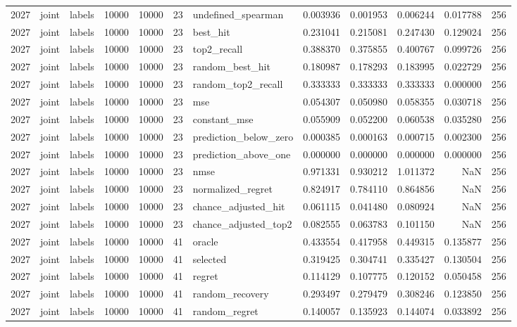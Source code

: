 \begin{tabular}{rllrrrlrrrrr}
2027 & joint & labels & 10000 & 10000 & 23 & undefined_spearman & 0.003936 & 0.001953 & 0.006244 & 0.017788 & 256 \\
2027 & joint & labels & 10000 & 10000 & 23 & best_hit & 0.231041 & 0.215081 & 0.247430 & 0.129024 & 256 \\
2027 & joint & labels & 10000 & 10000 & 23 & top2_recall & 0.388370 & 0.375855 & 0.400767 & 0.099726 & 256 \\
2027 & joint & labels & 10000 & 10000 & 23 & random_best_hit & 0.180987 & 0.178293 & 0.183995 & 0.022729 & 256 \\
2027 & joint & labels & 10000 & 10000 & 23 & random_top2_recall & 0.333333 & 0.333333 & 0.333333 & 0.000000 & 256 \\
2027 & joint & labels & 10000 & 10000 & 23 & mse & 0.054307 & 0.050980 & 0.058355 & 0.030718 & 256 \\
2027 & joint & labels & 10000 & 10000 & 23 & constant_mse & 0.055909 & 0.052200 & 0.060538 & 0.035280 & 256 \\
2027 & joint & labels & 10000 & 10000 & 23 & prediction_below_zero & 0.000385 & 0.000163 & 0.000715 & 0.002300 & 256 \\
2027 & joint & labels & 10000 & 10000 & 23 & prediction_above_one & 0.000000 & 0.000000 & 0.000000 & 0.000000 & 256 \\
2027 & joint & labels & 10000 & 10000 & 23 & nmse & 0.971331 & 0.930212 & 1.011372 & NaN & 256 \\
2027 & joint & labels & 10000 & 10000 & 23 & normalized_regret & 0.824917 & 0.784110 & 0.864856 & NaN & 256 \\
2027 & joint & labels & 10000 & 10000 & 23 & chance_adjusted_hit & 0.061115 & 0.041480 & 0.080924 & NaN & 256 \\
2027 & joint & labels & 10000 & 10000 & 23 & chance_adjusted_top2 & 0.082555 & 0.063783 & 0.101150 & NaN & 256 \\
2027 & joint & labels & 10000 & 10000 & 41 & oracle & 0.433554 & 0.417958 & 0.449315 & 0.135877 & 256 \\
2027 & joint & labels & 10000 & 10000 & 41 & selected & 0.319425 & 0.304741 & 0.335427 & 0.130504 & 256 \\
2027 & joint & labels & 10000 & 10000 & 41 & regret & 0.114129 & 0.107775 & 0.120152 & 0.050458 & 256 \\
2027 & joint & labels & 10000 & 10000 & 41 & random_recovery & 0.293497 & 0.279479 & 0.308246 & 0.123850 & 256 \\
2027 & joint & labels & 10000 & 10000 & 41 & random_regret & 0.140057 & 0.135923 & 0.144074 & 0.033892 & 256 \\

\end{tabular}
